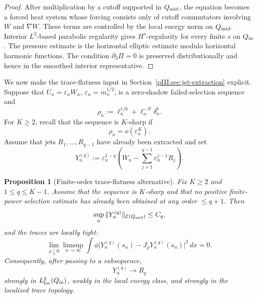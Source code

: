 \documentclass[11pt]{article}
\numberwithin{equation}{section}
\theoremstyle{plain}
\newtheorem{proposition}{Proposition}[section]
\theoremstyle{definition}
\theoremstyle{remark}
\newcommand{\calE}{\mathcal E}
\begin{document}
\begin{proof}
After multiplication by a cutoff supported in \(Q_{\rm mid}\), the equation becomes a forced heat
system whose forcing consists only of cutoff commutators involving \(W\) and \(\nabla W\).  These
terms are controlled by the local energy norm on \(Q_{\rm mid}\).  Interior \(L^2\)-based parabolic
regularity gives \(H^s\)-regularity for every finite \(s\) on \(Q_{\rm in}\).  The pressure estimate is the
horizontal elliptic estimate modulo horizontal harmonic functions.  The condition \(\partial_3\Pi=0\)
is preserved distributionally and hence in the smoothed interior representative.
\end{proof}

We now make the trace-flatness input in Section~\ref{pIII:sec:jet-extraction} explicit.  Suppose that
\(U_n=\varepsilon_nW_n\), \(\varepsilon_n=m_n^{1/2}\), is a zero-shadow failed-selection sequence and
\[
        \rho_n:=\ell_n^{1/6}+\ell_n^{-N}\delta_n^b.
\]
For \(K\ge2\), recall that the sequence is \(K\)-sharp if
\[
        \rho_n=o(\varepsilon_n^K).
\]
Assume that jets \(R_1,\ldots,R_{q-1}\) have already been extracted and set
\[
        Y_n^{(q)}:=\varepsilon_n^{1-q}
        \left(W_n-\sum_{j=1}^{q-1}\varepsilon_n^{j-1}R_j\right).
\]

\begin{proposition}[Finite-order trace-flatness alternative]
\label{pIII:prop:finite-order-trace-flatness-alternative}
Fix \(K\ge2\) and \(1\le q\le K-1\).  Assume that the sequence is \(K\)-sharp and that no positive
finite-power selection estimate has already been obtained at any order \(\le q+1\).  Then
\[
        \sup_n\|Y_n^{(q)}\|_{\calE(Q_{\rm mid})}\le C_q,
\]
and the traces are locally tight:
\[
        \lim_{\rho\downarrow0}\limsup_{n\to\infty}
        \int \phi\big|Y_n^{(q)}(s_n)-J_\rho Y_n^{(q)}(s_n)\big|^2\,dx=0.
\]
Consequently, after passing to a subsequence,
\[
        Y_n^{(q)}\to R_q
\]
strongly in \(L^2_{\rm loc}(Q_{\rm in})\), weakly in the local energy class, and strongly in the
localized trace topology.
\end{proposition}
\end{document}
